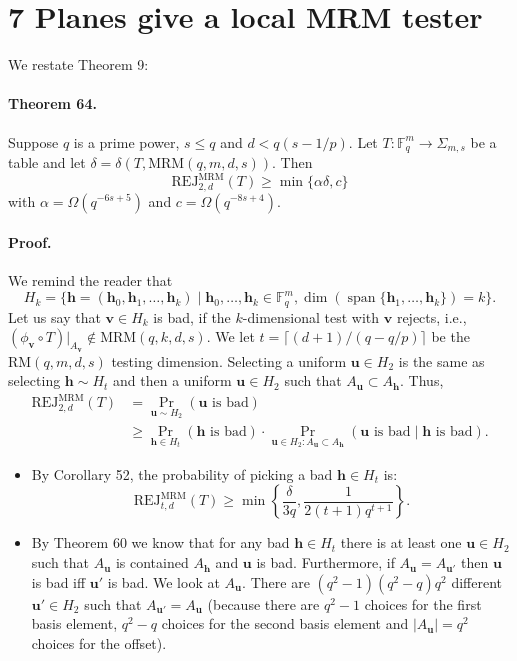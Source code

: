 \section*{7 Planes give a local MRM tester}
We restate Theorem 9:
\paragraph{Theorem 64.} Suppose $q$ is a prime power, $s\leq q$ and $d<q(s-1/p)$. Let $T:\mathbb F_q^m\to\Sigma_{m,s}$ be a table and let $\delta=\delta(T,\mathrm{MRM}(q,m,d,s))$. Then
\[\mathrm{REJ}_{2,d}^{\mathrm{MRM}}(T)\geq\min\{\alpha\delta,c\}\]
with $\alpha=\Omega(q^{-6s+5})$ and $c=\Omega(q^{-8s+4})$.
\paragraph{Proof.} We remind the reader that
\[H_k=\{\boldsymbol h=(\boldsymbol h_0,\boldsymbol h_1,\ldots,\boldsymbol h_k)\mid\boldsymbol h_0,\ldots,\boldsymbol h_k\in\mathbb F_q^m,\dim(\operatorname{span}\{\boldsymbol h_1,\ldots,\boldsymbol h_k\})=k\}.\]
Let us say that $\boldsymbol v\in H_k$ is bad, if the $k$-dimensional test with $\boldsymbol v$ rejects, i.e., $(\phi_{\boldsymbol v}\circ T)|_{A_{\boldsymbol v}}\notin\mathrm{MRM}(q,k,d,s)$. We let $t=\lceil(d+1)/(q-q/p)\rceil$ be the $\mathrm{RM}(q,m,d,s)$ testing dimension. Selecting a uniform $\boldsymbol u\in H_2$ is the same as selecting $\boldsymbol h\sim H_t$ and then a uniform $\boldsymbol u\in H_2$ such that $A_{\boldsymbol u}\subset A_{\boldsymbol h}$. Thus,
\begin{align*}
\mathrm{REJ}_{2,d}^{\mathrm{MRM}}(T)&=\Pr_{\boldsymbol u\sim H_2}(\boldsymbol u\text{ is bad})\\
&\geq\Pr_{\boldsymbol h\in H_t}(\boldsymbol h\text{ is bad})\cdot\Pr_{\boldsymbol u\in H_2:A_{\boldsymbol u}\subset A_{\boldsymbol h}}(\boldsymbol u\text{ is bad}\mid\boldsymbol h\text{ is bad}).
\end{align*}
\begin{itemize}
\item By Corollary 52, the probability of picking a bad $\boldsymbol h\in H_t$ is:
\[\mathrm{REJ}_{t,d}^{\mathrm{MRM}}(T)\geq\min\left\{\frac\delta{3q},\frac1{2(t+1)q^{t+1}}\right\}.\]
\item By Theorem 60 we know that for any bad $\boldsymbol h\in H_t$ there is at least one $\boldsymbol u\in H_2$ such that $A_{\boldsymbol u}$ is contained $A_{\boldsymbol h}$ and $\boldsymbol u$ is bad. Furthermore, if $A_{\boldsymbol u}=A_{\boldsymbol u'}$ then $\boldsymbol u$ is bad iff $\boldsymbol u'$ is bad. We look at $A_{\boldsymbol u}$. There are $(q^2-1)(q^2-q)q^2$ different $\boldsymbol u'\in H_2$ such that $A_{\boldsymbol u'}=A_{\boldsymbol u}$ (because there are $q^2-1$ choices for the first basis element, $q^2-q$ choices for the second basis element and $|A_{\boldsymbol u}|=q^2$ choices for the offset).
\end{itemize}
